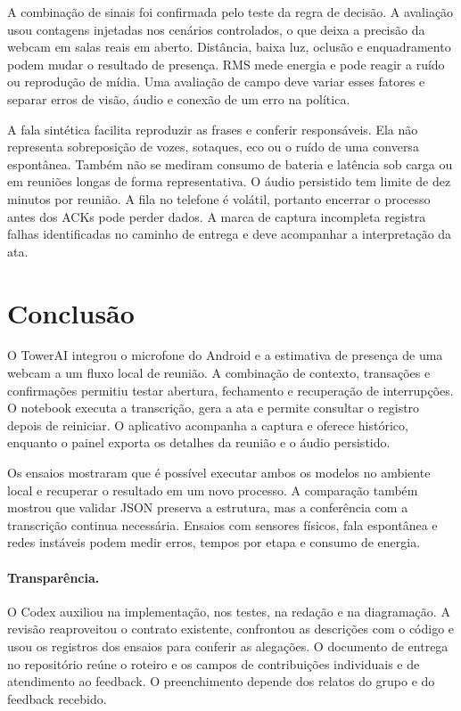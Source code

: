 \documentclass[12pt]{article}
\begin{document}
A combinação de sinais foi confirmada pelo teste da regra de decisão. A avaliação usou contagens injetadas nos cenários controlados, o que deixa a precisão da webcam em salas reais em aberto. Distância, baixa luz, oclusão e enquadramento podem mudar o resultado de presença. RMS mede energia e pode reagir a ruído ou reprodução de mídia. Uma avaliação de campo deve variar esses fatores e separar erros de visão, áudio e conexão de um erro na política.

A fala sintética facilita reproduzir as frases e conferir responsáveis. Ela não representa sobreposição de vozes, sotaques, eco ou o ruído de uma conversa espontânea. Também não se mediram consumo de bateria e latência sob carga ou em reuniões longas de forma representativa. O áudio persistido tem limite de dez minutos por reunião. A fila no telefone é volátil, portanto encerrar o processo antes dos ACKs pode perder dados. A marca de captura incompleta registra falhas identificadas no caminho de entrega e deve acompanhar a interpretação da ata.

\section{Conclusão}

O TowerAI integrou o microfone do Android e a estimativa de presença de uma webcam a um fluxo local de reunião. A combinação de contexto, transações e confirmações permitiu testar abertura, fechamento e recuperação de interrupções. O notebook executa a transcrição, gera a ata e permite consultar o registro depois de reiniciar. O aplicativo acompanha a captura e oferece histórico, enquanto o painel exporta os detalhes da reunião e o áudio persistido.

Os ensaios mostraram que é possível executar ambos os modelos no ambiente local e recuperar o resultado em um novo processo. A comparação também mostrou que validar JSON preserva a estrutura, mas a conferência com a transcrição continua necessária. Ensaios com sensores físicos, fala espontânea e redes instáveis podem medir erros, tempos por etapa e consumo de energia.

\paragraph{Transparência.}
O Codex auxiliou na implementação, nos testes, na redação e na diagramação. A revisão reaproveitou o contrato existente, confrontou as descrições com o código e usou os registros dos ensaios para conferir as alegações. O documento de entrega no repositório reúne o roteiro e os campos de contribuições individuais e de atendimento ao feedback. O preenchimento depende dos relatos do grupo e do feedback recebido.

\clearpage


\end{document}
